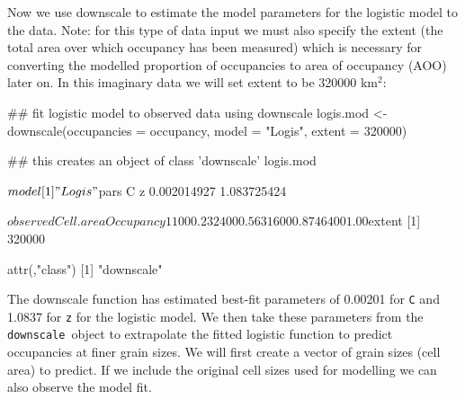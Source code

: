 \documentclass{article}[12pt, a4paper]
\begin{document}
Now we use downscale to estimate the model parameters for the logistic model to the data. Note: for this type of data input we must also specify the extent (the total area over which occupancy has been measured) which is necessary for converting the modelled proportion of occupancies to area of occupancy (AOO) later on. In this imaginary data we will set extent to be 320000 km$^2$:

\begin{Schunk}
\begin{Sinput}
## fit logistic model to observed data using downscale
logis.mod <- downscale(occupancies = occupancy,
                       model = "Logis",
                       extent = 320000)
                       
## this creates an object of class 'downscale'
logis.mod
\end{Sinput}
\begin{Soutput}
$model
[1] "Logis"

$pars
          C           z 
0.002014927 1.083725424 

$observed
  Cell.area Occupancy
1       100      0.23
2       400      0.56
3      1600      0.87
4      6400      1.00

$extent
[1] 320000

attr(,"class")
[1] "downscale"

\end{Soutput}
\end{Schunk}

The downscale function has estimated best-fit parameters of 0.00201 for \texttt{C} and 1.0837 for \texttt{z} for the logistic model. We then take these parameters from the \textquotesingle \texttt{downscale}\textquotesingle\ object to extrapolate the fitted logistic function to predict occupancies at finer grain sizes. We will first create a vector of grain sizes (cell area) to predict. If we include the original cell sizes used for modelling we can also observe the model fit.
\end{document}
